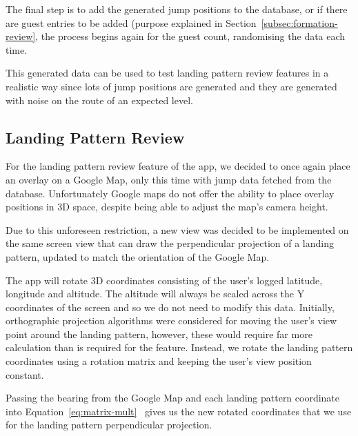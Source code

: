 The final step is to add the generated jump positions to the database, or if there are guest entries to be added (purpose explained in Section~\vref{subsec:formation-review}, the process begins again for the guest count, randomising the data each time.

This generated data can be used to test landing pattern review features in a realistic way since lots of jump positions are generated and they are generated with noise on the route of an expected level.

\subsection{Landing Pattern Review}
For the landing pattern review feature of the app, we decided to once again place an overlay on a Google Map, only this time with jump data fetched from the database. Unfortunately Google maps do not offer the ability to place overlay positions in 3D space, despite being able to adjust the map's camera height.

Due to this unforeseen restriction, a new view was decided to be implemented on the same screen view that can draw the perpendicular projection of a landing pattern, updated to match the orientation of the Google Map.

The app will rotate 3D coordinates consisting of the user's logged latitude, longitude and altitude.
The altitude will always be scaled across the Y coordinates of the screen and so we do not need to modify this data. Initially, orthographic projection algorithms were considered for moving the user's view point around the landing pattern, however, these would require far more calculation than is required for the feature. Instead, we rotate the landing pattern coordinates using a rotation matrix and keeping the user's view position constant.

Passing the bearing from the Google Map and each landing pattern coordinate into Equation~\vref{eq:matrix-mult}~\cite{lounesto_clifford_2001} gives us the new rotated coordinates that we use for the landing pattern perpendicular projection.

